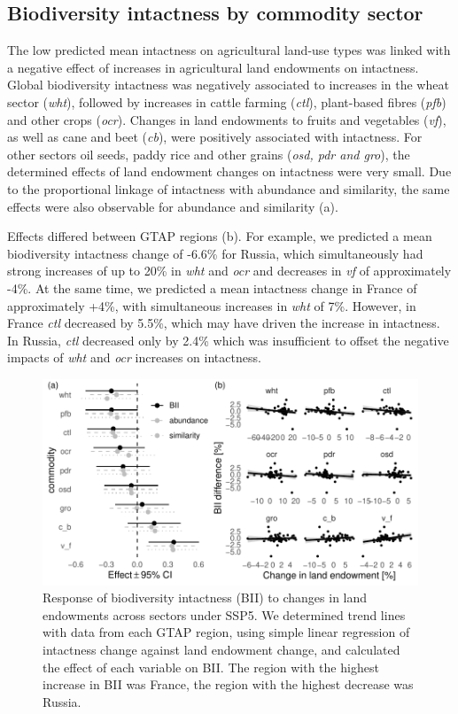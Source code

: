 \documentclass[titlesmallcaps,copyrightpage]{uomthesis}\usepackage[]{graphicx}\usepackage[]{color}
\begin{document}
\subsection{Biodiversity intactness by commodity sector}
The low predicted mean intactness on agricultural land-use types was linked with a negative effect of increases in agricultural land endowments on intactness. Global biodiversity intactness was negatively associated to increases in the wheat sector (\textit{wht}), followed by increases in cattle farming (\textit{ctl}), plant-based fibres (\textit{pfb}) and other crops (\textit{ocr}). Changes in land endowments to fruits and vegetables (\textit{v\textunderscore f}), as well as cane and beet (\textit{c\textunderscore b}), were positively associated with intactness. For other sectors oil seeds, paddy rice and other grains (\textit{osd, pdr and gro}), the determined effects of land endowment changes on intactness were very small. Due to the proportional linkage of intactness with abundance and similarity, the same effects were also observable for abundance and similarity (a).

Effects differed between GTAP regions (b). For example, we predicted a mean biodiversity intactness change of -6.6\% for Russia, which simultaneously had strong increases of up to 20\% in \textit{wht} and \textit{ocr} and decreases in \textit{v\textunderscore f} of approximately -4\%. At the same time, we predicted a mean intactness change in France of approximately +4\%, with simultaneous increases in \textit{wht} of 7\%. However, in France \textit{ctl} decreased by 5.5\%, which may have driven the increase in intactness. In Russia, \textit{ctl} decreased only by 2.4\% which was insufficient to offset the negative impacts of \textit{wht} and \textit{ocr} increases on intactness.

\begin{figure}[htb]
  \centering
    \includegraphics{chapters/figures/chapter4/fig_biigtap.pdf}
    \caption{Response of biodiversity intactness (BII) to changes in land endowments across sectors under SSP5. We determined trend lines with data from each GTAP region, using simple linear regression of intactness change against land endowment change, and calculated the effect of each variable on BII. The region with the highest increase in BII was France, the region with the highest decrease was Russia.}
    \label{ch4:fig_biigtap}
\end{figure}
\end{document}
